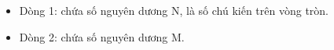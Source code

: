 \begin{itemize}
	\item     Dòng 1: chứa số nguyên dương N, là số chú kiến trên vòng tròn.   
	\item     Dòng 2: chứa số nguyên dương M.   
\end{itemize}